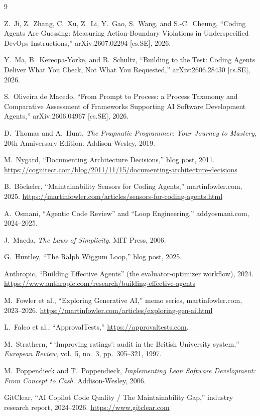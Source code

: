 \documentclass[11pt]{article}
\begin{document}
\begin{thebibliography}{9}

Z.~Ji, Z.~Zhang, C.~Xu, Z.~Li, Y.~Gao, S.~Wang, and S.-C.~Cheung,
``Coding Agents Are Guessing: Measuring Action-Boundary Violations in
Underspecified DevOps Instructions,'' arXiv:2607.02294 [cs.SE], 2026.

Y.~Ma, B.~Kereopa-Yorke, and B.~Schultz,
``Building to the Test: Coding Agents Deliver What You Check, Not What You
Requested,'' arXiv:2606.28430 [cs.SE], 2026.

S.~Oliveira de Macedo,
``From Prompt to Process: a Process Taxonomy and Comparative Assessment of
Frameworks Supporting AI Software Development Agents,''
arXiv:2606.04967 [cs.SE], 2026.

D.~Thomas and A.~Hunt,
\emph{The Pragmatic Programmer: Your Journey to Mastery}, 20th Anniversary
Edition. Addison-Wesley, 2019.

M.~Nygard, ``Documenting Architecture Decisions,'' blog post, 2011.
\url{https://cognitect.com/blog/2011/11/15/documenting-architecture-decisions}

B.~B\"ockeler, ``Maintainability Sensors for Coding Agents,''
martinfowler.com, 2025.
\url{https://martinfowler.com/articles/sensors-for-coding-agents.html}

A.~Osmani, ``Agentic Code Review'' and ``Loop Engineering,'' addyosmani.com,
2024--2025.

J.~Maeda, \emph{The Laws of Simplicity}. MIT Press, 2006.

G.~Huntley, ``The Ralph Wiggum Loop,'' blog post, 2025.

Anthropic, ``Building Effective Agents'' (the evaluator-optimizer workflow),
2024. \url{https://www.anthropic.com/research/building-effective-agents}

M.~Fowler et al., ``Exploring Generative AI,'' memo series,
martinfowler.com, 2023--2026.
\url{https://martinfowler.com/articles/exploring-gen-ai.html}

L.~Falco et al., ``ApprovalTests,'' \url{https://approvaltests.com}.

M.~Strathern, ``\,`Improving ratings': audit in the British University
system,'' \emph{European Review}, vol.~5, no.~3, pp.~305--321, 1997.

M.~Poppendieck and T.~Poppendieck, \emph{Implementing Lean Software
Development: From Concept to Cash}. Addison-Wesley, 2006.

GitClear, ``AI Copilot Code Quality / The Maintainability Gap,'' industry
research report, 2024--2026. \url{https://www.gitclear.com}

\end{thebibliography}
\end{document}
